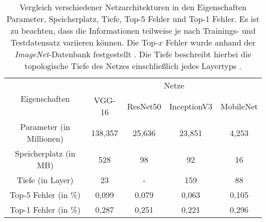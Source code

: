 \begin{table}[H]
	\caption{Vergleich verschiedener Netzarchitekturen in den Eigenschaften Parameter, Speicherplatz, Tiefe, Top-5 Fehler und Top-1 Fehler. Es ist zu beachten, dass die Informationen teilweise je nach Trainings- und Testdatensatz variieren können. Die Top-$x$ Fehler wurde anhand der \textit{ImageNet}-Datenbank festgestellt \cite{keras}. Die Tiefe beschreibt hierbei die topologische Tiefe des Netzes einschließlich jedes Layertyps \cite{keras}.}
	\begin{center}
		\begin{tabular}{|c|c|c|c|c|}
			\hline
			\multirow{2}{*}{Eigenschaften}& \multicolumn{4}{c|}{\centering Netze} \\
			\cline{2-5} & \multicolumn{1}{c|}{VGG-16} & \multicolumn{1}{c|}{ResNet50} & \multicolumn{1}{c|}{InceptionV3} & \multicolumn{1}{c|}{MobileNet} \\ \hline
			Parameter (in Millionen)	& 138,357 	& 25,636 	& 23,851 	& 4,253 \\
			Speicherplatz (in MB)		& 528 		& 98 		& 92 		& 16 \\
			Tiefe (in Layer) 			& 23 		& -			& 159 		& 88 \\
			Top-5 Fehler (in \%)	& 0,099 	& 0,079 	& 0,063		& 0,105 \\
			Top-1 Fehler (in \%) 	& 0,287 	& 0,251 	& 0,221		& 0,296 \\
			\hline
		\end{tabular}
	\end{center}

	\label{fig: cnnvergleich}
\end{table}